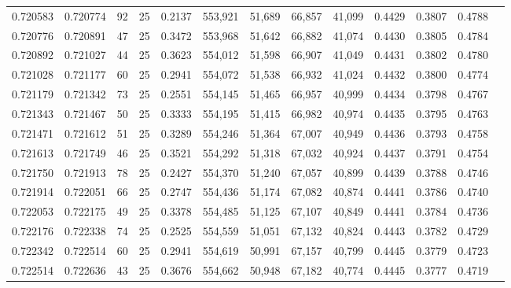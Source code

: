 \begin{tabular}{rrrrrrrrrrrrr}
0.720583 & 0.720774 &    92 &  25 &                                     0.2137 & 553,921 &  51,689 &  66,857 &  41,099 & 0.4429 & 0.3807 & 0.4788 \\
0.720776 & 0.720891 &    47 &  25 &                                     0.3472 & 553,968 &  51,642 &  66,882 &  41,074 & 0.4430 & 0.3805 & 0.4784 \\
0.720892 & 0.721027 &    44 &  25 &                                     0.3623 & 554,012 &  51,598 &  66,907 &  41,049 & 0.4431 & 0.3802 & 0.4780 \\
0.721028 & 0.721177 &    60 &  25 &                                     0.2941 & 554,072 &  51,538 &  66,932 &  41,024 & 0.4432 & 0.3800 & 0.4774 \\
0.721179 & 0.721342 &    73 &  25 &                                     0.2551 & 554,145 &  51,465 &  66,957 &  40,999 & 0.4434 & 0.3798 & 0.4767 \\
0.721343 & 0.721467 &    50 &  25 &                                     0.3333 & 554,195 &  51,415 &  66,982 &  40,974 & 0.4435 & 0.3795 & 0.4763 \\
0.721471 & 0.721612 &    51 &  25 &                                     0.3289 & 554,246 &  51,364 &  67,007 &  40,949 & 0.4436 & 0.3793 & 0.4758 \\
0.721613 & 0.721749 &    46 &  25 &                                     0.3521 & 554,292 &  51,318 &  67,032 &  40,924 & 0.4437 & 0.3791 & 0.4754 \\
0.721750 & 0.721913 &    78 &  25 &                                     0.2427 & 554,370 &  51,240 &  67,057 &  40,899 & 0.4439 & 0.3788 & 0.4746 \\
0.721914 & 0.722051 &    66 &  25 &                                     0.2747 & 554,436 &  51,174 &  67,082 &  40,874 & 0.4441 & 0.3786 & 0.4740 \\
0.722053 & 0.722175 &    49 &  25 &                                     0.3378 & 554,485 &  51,125 &  67,107 &  40,849 & 0.4441 & 0.3784 & 0.4736 \\
0.722176 & 0.722338 &    74 &  25 &                                     0.2525 & 554,559 &  51,051 &  67,132 &  40,824 & 0.4443 & 0.3782 & 0.4729 \\
0.722342 & 0.722514 &    60 &  25 &                                     0.2941 & 554,619 &  50,991 &  67,157 &  40,799 & 0.4445 & 0.3779 & 0.4723 \\
0.722514 & 0.722636 &    43 &  25 &                                     0.3676 & 554,662 &  50,948 &  67,182 &  40,774 & 0.4445 & 0.3777 & 0.4719 \\

\end{tabular}
